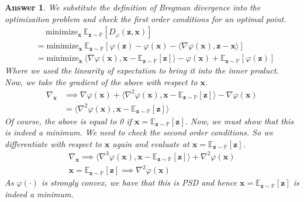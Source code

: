 \documentclass[12pt]{article}
\theoremstyle{colon}
\newtheorem*{answer}{Answer}
\begin{document}
\begin{answer}
	We substitute the definition of Bregman divergence into the optimizaiton problem and check the first order conditions for an optimal point.
	\begin{align*}
		&\quad \ \text{minimize}_{\bm{x}} \ \mathbb{E}_{\bm{z} \sim \mathbb{P}} [ D_{\varphi} (\bm{z}, \bm{x}) ] \\
		&= \text{minimize}_{\bm{x}} \ \mathbb{E}_{\bm{z} \sim \mathbb{P}} [ \varphi(\bm{z}) - \varphi(\bm{x}) - \langle \nabla \varphi(\bm{x}), \bm{z} - \bm{x} \rangle] \\
		&= \text{minimize}_{\bm{x}} \ \langle \nabla \varphi(\bm{x}), \bm{x} - \mathbb{E}_{\bm{z} \sim \mathbb{P}} [\bm{z} ] \rangle - \varphi(\bm{x}) + \mathbb{E}_{\bm{z} \sim \mathbb{P}} [ \varphi(\bm{z})]
	\end{align*}
	Where we used the linearity of expectation to bring it into the inner product. Now, we take the gradient of the above with respect to $\bm{x}$.
	\begin{align*}
		\nabla_{\bm{x}} &\implies \nabla \varphi(\bm{x}) + \langle \nabla^2 \varphi(\bm{x}), \bm{x} - \mathbb{E}_{\bm{z} \sim \mathbb{P}} [\bm{z} ] \rangle - \nabla \varphi(\bm{x}) \\
		&= \langle \nabla^2 \varphi(\bm{x}), \bm{x} - \mathbb{E}_{\bm{z} \sim \mathbb{P}} [\bm{z} ] \rangle
	\end{align*}
	Of course, the above is equal to 0 if $\bm{x} = \mathbb{E}_{\bm{z} \sim \mathbb{P}} [\bm{z} ]$. Now, we must show that this is indeed a minimum. We need to check the second order conditions. So we differentiate with respect to $\bm{x}$ again and evaluate at $\bm{x} = \mathbb{E}_{\bm{z} \sim \mathbb{P}} [\bm{z} ]$.
	\begin{gather*}
		\nabla_{\bm{x}} \implies \langle \nabla^3 \varphi(\bm{x}), \bm{x} - \mathbb{E}_{\bm{z} \sim \mathbb{P}} [\bm{z} ] \rangle + \nabla^2 \varphi(\bm{x}) \\
		\bm{x} = \mathbb{E}_{\bm{z} \sim \mathbb{P}} [\bm{z} ] \implies \nabla^2 \varphi(\bm{x})
	\end{gather*}
	As $\varphi(\cdot)$ is strongly convex, we have that this is PSD and hence $\bm{x} = \mathbb{E}_{\bm{z} \sim \mathbb{P}} [\bm{z} ]$ is indeed a minimum.
\end{answer}

\clearpage
\end{document}

